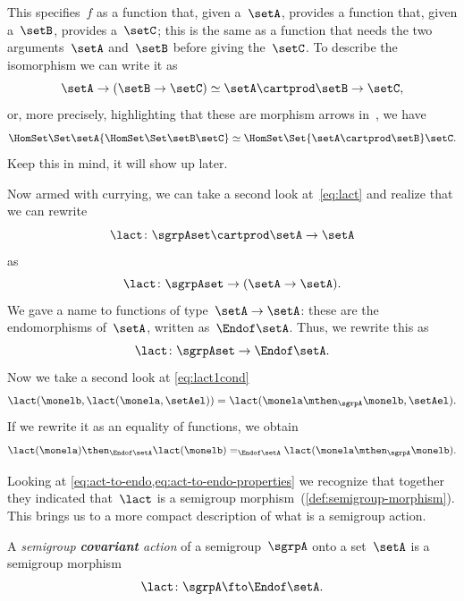 This specifies~$f$ as a function that, given a~$\setA$, provides a function that, given a~$\setB$, provides a~$\setC$;
this is the same as a function that needs the two arguments~$\setA$ and~$\setB$ before giving the~$\setC$.
To describe the isomorphism we can write it as
\begin{equation}\label{eq:currying-iso-1}
  \setA \to ( \setB \to \setC) \simeq  \setA \cartprod \setB \to \setC,
\end{equation}
or, more precisely, highlighting that these are morphism arrows in~\Set, we have
\begin{equation}\label{eq:currying-iso-2}
  \HomSet\Set\setA{\HomSet\Set\setB\setC} \simeq \HomSet\Set{\setA \cartprod \setB}\setC.
\end{equation}
Keep this in mind, it will show up later.

Now armed with currying, we can take a second look at~\cref{eq:lact} and realize that we can rewrite
\begin{equation}\label{eq:currying-lact-1}
\lact \colon \sgrpAset \cartprod \setA \to \setA
\end{equation}
as
\begin{equation}\label{eq:currying-lact-2}
  \lact \colon \sgrpAset \to (\setA \to \setA).
\end{equation}
We gave a name to functions of type~$\setA \to \setA$: these are the endomorphisms of~$\setA$, written as~$\Endof\setA$.
Thus, we rewrite this as
\begin{equation}\label{eq:act-to-endo}
  \lact \colon \sgrpAset \to \Endof\setA.
\end{equation}
Now we take a second look at \cref{eq:lact1cond}
\begin{equation}\label{eq:lact1cond-2}
  \lact(\monelb, \lact(\monela, \setAel)) = \lact(\monela \mthen_\sgrpA \monelb, \setAel).
\end{equation}
If we rewrite it as an equality of functions, we obtain
\begin{equation} \label{eq:act-to-endo-properties}
  \lact(\monela) \then_{\Endof\setA}  \lact(\monelb) =_{\Endof\setA} \lact(\monela \mthen_\sgrpA \monelb).
\end{equation}

Looking at \cref{eq:act-to-endo,eq:act-to-endo-properties} we recognize that together
they indicated that~$\lact$ is a semigroup morphism~(\cref{def:semigroup-morphism}). This brings us to a more compact description of what is a semigroup action.

\begin{ctdefinition}\label{def:semigroup-cov-action}
  A \emph{semigroup \textbf{covariant} action} of a semigroup~$\sgrpA$ onto a set~$\setA$ is a semigroup morphism
  \begin{equation}\label{eq:act-semigroup}
    \lact \colon \sgrpA \fto \Endof\setA.
  \end{equation}
\end{ctdefinition}

